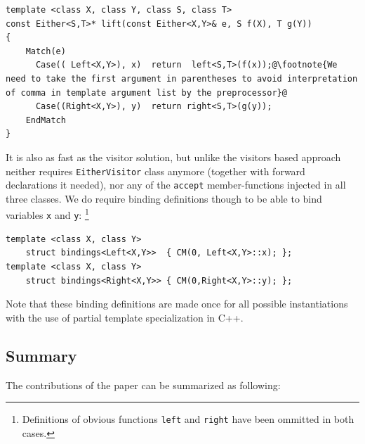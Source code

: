 \documentclass[preprint]{sigplanconf}
\makeatletter
\DeclareRobustCommand{\code}[1]{{\lstinline[breaklines=false,escapechar=@]{#1}}}
\makeatother
\begin{document}
\begin{lstlisting}[keepspaces,columns=flexible]
template <class X, class Y, class S, class T>
const Either<S,T>* lift(const Either<X,Y>& e, S f(X), T g(Y))
{
    Match(e)
      Case(( Left<X,Y>), x)  return  left<S,T>(f(x));@\footnote{We need to take the first argument in parentheses to avoid interpretation of comma in template argument list by the preprocessor}@
      Case((Right<X,Y>), y)  return right<S,T>(g(y));
    EndMatch
}
\end{lstlisting}

It is also as fast as the visitor solution, but unlike the visitors based 
approach neither requires \code{EitherVisitor} class anymore (together with 
forward declarations it needed), nor any of the \code{accept} member-functions 
injected in all three classes. We do require binding definitions though to be 
able to bind variables \code{x} and \code{y}:
\footnote{Definitions of obvious functions \code{left} and \code{right} have 
been ommitted in both cases.}

\begin{lstlisting}[keepspaces,columns=flexible]
template <class X, class Y> 
    struct bindings<Left<X,Y>>  { CM(0, Left<X,Y>::x); };
template <class X, class Y> 
    struct bindings<Right<X,Y>> { CM(0,Right<X,Y>::y); };
\end{lstlisting}

Note that these binding definitions are made once for all possible instantiations 
with the use of partial template specialization in C++.

\subsection{Summary}

The contributions of the paper can be summarized as following:
\end{document}

